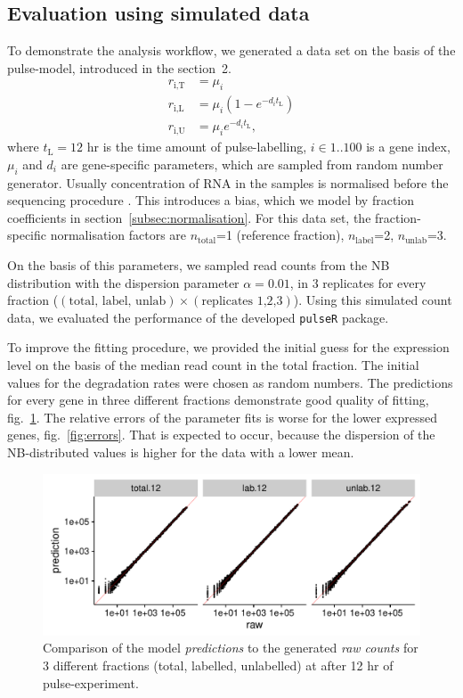\subsection{Evaluation using simulated data}
To demonstrate the analysis workflow, we generated a data 
set on the basis of the pulse-model, introduced in the section~2.
\begin{align}
 r_\text{i,T}&=\mu_i\\
 r_\text{i,L}&=\mu_i \left(1-e^{-d_it_\text{L}}\right)\\
 r_\text{i,U}&=\mu_i e^{-d_it_\text{L}},
\end{align}
where $t_\text{L} = 12$ hr is the time amount of pulse-labelling,
$i \in 1..100$ is a gene index, $\mu_i$ and $d_i$ are gene-specific parameters,
which are sampled from random number generator.
Usually concentration of RNA in the samples is normalised before the
sequencing procedure \citep{}. This introduces a bias, which 
we model by fraction coefficients in section~\ref{subsec:normalisation}. 
For this data set,  the fraction-specific normalisation factors are 
$n_\text{total}$=1 ({reference fraction}),
$n_\text{label}$=2,
$n_\text{unlab}$=3.
\par 
On the basis of this parameters,  we sampled read counts from the NB distribution 
with the dispersion parameter $\alpha=0.01$,  in 3 replicates for 
every fraction ($(\text{total, label, unlab})\times(\text{replicates 1,2,3})$).
Using this simulated count data,  we evaluated the performance of the developed
\verb|pulseR| package.
\par
To improve the fitting procedure, we provided the initial guess for the expression level
on the basis of the median read count in the total fraction.
The initial values for the degradation rates were chosen as random numbers.
The predictions for every gene in three different fractions demonstrate
good quality of fitting, fig.~\ref{fig:predictions}. The relative errors of
the parameter fits is worse for the lower expressed genes, fig.~\ref{fig:errors}.
That is expected to occur, because the dispersion of the NB-distributed values
is higher for the data with a lower mean.
\begin{figure}
 \includegraphics[width=\linewidth]{fig/predictions}
 \caption{Comparison of the model \emph{predictions} to the generated 
 \emph{raw counts} for 3 different fractions (total, labelled, unlabelled)
 at after 12 hr of pulse-experiment. }
 \label{fig:predictions}
\end{figure}

